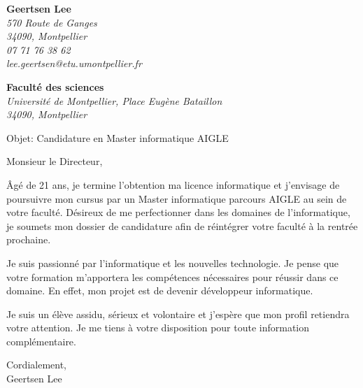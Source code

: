 \documentclass[11pt]{letter}
\begin{document}
 \sffamily
 \hfill

 \begin{flushleft}
 {\bfseries Geertsen Lee}\\[.35ex]
 \small\itshape 570 Route de Ganges\\34090, Montpellier\\[.35ex] 07 71 76 38 62\\lee.geertsen@etu.umontpellier.fr
 \end{flushleft}

 \begin{flushright}
 {\bfseries Faculté des sciences}\\[.35ex]
 \small\itshape
Université de Montpellier, Place Eugène Bataillon\\
 34090, Montpellier
 \end{flushright}

Objet: Candidature en Master informatique AIGLE

\opening{Monsieur le Directeur,}

Âgé de 21 ans, je termine l'obtention ma licence informatique et
j'envisage de poursuivre mon cursus par un Master informatique parcours AIGLE
au sein de votre faculté. Désireux de me perfectionner
dans les domaines de l'informatique, je soumets mon dossier de candidature afin
de réintégrer votre faculté à la rentrée prochaine.

Je suis passionné par l'informatique et les nouvelles technologie. Je pense que
votre formation m'apportera les compétences nécessaires pour réussir dans ce
domaine. En effet, mon projet est de devenir développeur informatique.

Je suis un élève assidu, sérieux et volontaire et j'espère que mon profil
retiendra votre attention. Je me tiens à votre disposition pour toute
information complémentaire.

\closing{Cordialement,\\Geertsen Lee}

\end{document}
